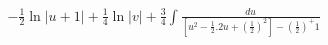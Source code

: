 \documentclass[preview]{standalone}
\begin{document}
\begin{align*}
-\frac{1}{2}\ln|u+1|+\frac{1}{4}\ln|v|+\frac{3}{4}\int\frac{du}{[u^2-\frac{1}{2}.2u+(\frac{1}{2})^2]-(\frac{1}{2})^+ 1}
\end{align*}
\end{document}

